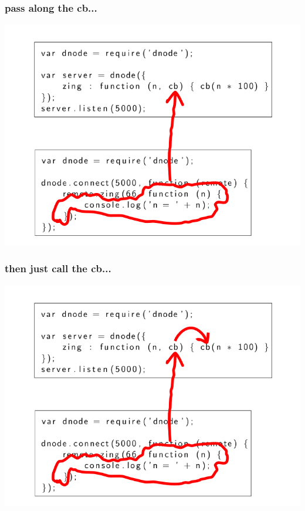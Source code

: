 \documentclass{beamer}
\begin{document}
\begin{frame}
    \frametitle{pass along the cb...}
    \includegraphics[scale=0.6]{images/zing_flow_2.png}
\end{frame}

\begin{frame}
    \frametitle{then just call the cb...}
    \includegraphics[scale=0.6]{images/zing_flow_3.png}
\end{frame}
\end{document}
